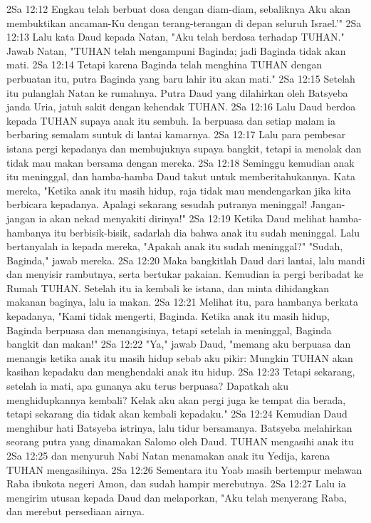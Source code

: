 2Sa 12:12  Engkau telah berbuat dosa dengan diam-diam, sebaliknya Aku akan membuktikan ancaman-Ku dengan terang-terangan di depan seluruh Israel.'"
2Sa 12:13  Lalu kata Daud kepada Natan, "Aku telah berdosa terhadap TUHAN." Jawab Natan, "TUHAN telah mengampuni Baginda; jadi Baginda tidak akan mati.
2Sa 12:14  Tetapi karena Baginda telah menghina TUHAN dengan perbuatan itu, putra Baginda yang baru lahir itu akan mati."
2Sa 12:15  Setelah itu pulanglah Natan ke rumahnya. Putra Daud yang dilahirkan oleh Batsyeba janda Uria, jatuh sakit dengan kehendak TUHAN.
2Sa 12:16  Lalu Daud berdoa kepada TUHAN supaya anak itu sembuh. Ia berpuasa dan setiap malam ia berbaring semalam suntuk di lantai kamarnya.
2Sa 12:17  Lalu para pembesar istana pergi kepadanya dan membujuknya supaya bangkit, tetapi ia menolak dan tidak mau makan bersama dengan mereka.
2Sa 12:18  Seminggu kemudian anak itu meninggal, dan hamba-hamba Daud takut untuk memberitahukannya. Kata mereka, "Ketika anak itu masih hidup, raja tidak mau mendengarkan jika kita berbicara kepadanya. Apalagi sekarang sesudah putranya meninggal! Jangan-jangan ia akan nekad menyakiti dirinya!"
2Sa 12:19  Ketika Daud melihat hamba-hambanya itu berbisik-bisik, sadarlah dia bahwa anak itu sudah meninggal. Lalu bertanyalah ia kepada mereka, "Apakah anak itu sudah meninggal?" "Sudah, Baginda," jawab mereka.
2Sa 12:20  Maka bangkitlah Daud dari lantai, lalu mandi dan menyisir rambutnya, serta bertukar pakaian. Kemudian ia pergi beribadat ke Rumah TUHAN. Setelah itu ia kembali ke istana, dan minta dihidangkan makanan baginya, lalu ia makan.
2Sa 12:21  Melihat itu, para hambanya berkata kepadanya, "Kami tidak mengerti, Baginda. Ketika anak itu masih hidup, Baginda berpuasa dan menangisinya, tetapi setelah ia meninggal, Baginda bangkit dan makan!"
2Sa 12:22  "Ya," jawab Daud, "memang aku berpuasa dan menangis ketika anak itu masih hidup sebab aku pikir: Mungkin TUHAN akan kasihan kepadaku dan menghendaki anak itu hidup.
2Sa 12:23  Tetapi sekarang, setelah ia mati, apa gunanya aku terus berpuasa? Dapatkah aku menghidupkannya kembali? Kelak aku akan pergi juga ke tempat dia berada, tetapi sekarang dia tidak akan kembali kepadaku."
2Sa 12:24  Kemudian Daud menghibur hati Batsyeba istrinya, lalu tidur bersamanya. Batsyeba melahirkan seorang putra yang dinamakan Salomo oleh Daud. TUHAN mengasihi anak itu
2Sa 12:25  dan menyuruh Nabi Natan menamakan anak itu Yedija, karena TUHAN mengasihinya.
2Sa 12:26  Sementara itu Yoab masih bertempur melawan Raba ibukota negeri Amon, dan sudah hampir merebutnya.
2Sa 12:27  Lalu ia mengirim utusan kepada Daud dan melaporkan, "Aku telah menyerang Raba, dan merebut persediaan airnya.
